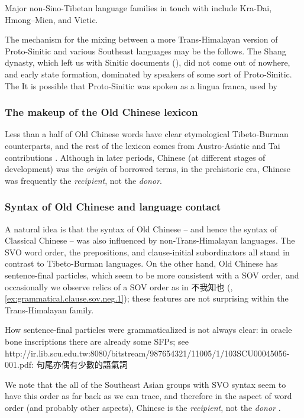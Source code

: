 \documentclass[UTF8, a4paper, oneside, scheme=plain, 12pt]{ctexrep}
\newcommand*{\citepage}[1]{p.~{#1}}
\begin{document}
Major non-Sino-Tibetan language families in touch with 
include Kra-Dai, Hmong–Mien, and Vietic.


The mechanism for the mixing between a more Trans-Himalayan version of Proto-Sinitic and various Southeast languages may be the follows.
The Shang dynasty, which left us with Sinitic documents (),
did not come out of nowhere,
and early state formation, dominated by speakers of some sort of Proto-Sinitic.
The 
It is possible that Proto-Sinitic was spoken as a lingua franca,
used by 

\subsubsection{The makeup of the Old Chinese lexicon}
Less than a half of Old Chinese words have clear etymological Tibeto-Burman counterparts,
and the rest of the lexicon comes from Austro-Asiatic and Tai contributions
\citep{mccraw2010lexical}.
Although in later periods, Chinese (at different stages of development) was the \emph{origin} of borrowed terms,
in the prehistoric era, Chinese was frequently the \emph{recipient}, not the \emph{donor}.

\subsubsection{Syntax of Old Chinese and language contact}
A natural idea is that the syntax of Old Chinese -- and hence the syntax of Classical Chinese -- 
was also influenced by non-Trans-Himalayan languages.
The SVO word order, the prepositions, and clause-initial subordinators all stand in contrast to Tibeto-Burman languages.
On the other hand, Old Chinese has sentence-final particles, which seem to be more consistent with a SOV order,
and occasionally we observe relics of a SOV order as in 不我知也
(, \ref{ex:grammatical.clause.sov.neg.1});
these features are not surprising within the Trans-Himalayan family.

How sentence-final particles were grammaticalized is not always clear:
in oracle bone inscriptions there are already some SFPs;
see http://ir.lib.scu.edu.tw:8080/bitstream/987654321/11005/1/103SCU00045056-001.pdf:
句尾亦偶有少數的語氣詞

We note that the all of the Southeast Asian groups with SVO syntax seem to
have this order as far back as we can trace,
and therefore in the aspect of word order (and probably other aspects),
Chinese is the \emph{recipient}, not the \emph{donor} \citep[\citepage{82-85}]{delancey2013origins}.
\end{document}

